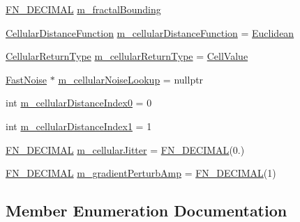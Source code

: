 \begin{DoxyCompactItemize}
\item 
\mbox{\hyperlink{_fast_noise_8h_a75a9ef6d2541c4921815b885bfd449c3}{F\+N\+\_\+\+D\+E\+C\+I\+M\+AL}} \mbox{\hyperlink{class_fast_noise_a64c5725bb6bf6f7a754176c3482ec782}{m\+\_\+fractal\+Bounding}}
\item 
\mbox{\hyperlink{class_fast_noise_a457e58d0da6dbe486deb5a21a3db52bf}{Cellular\+Distance\+Function}} \mbox{\hyperlink{class_fast_noise_a2013ce945eec3663ae04a5b36d3fdff8}{m\+\_\+cellular\+Distance\+Function}} = \mbox{\hyperlink{class_fast_noise_a457e58d0da6dbe486deb5a21a3db52bfa71b164a880847b07288ce70507bf1453}{Euclidean}}
\item 
\mbox{\hyperlink{class_fast_noise_a942d73b97b870138c9a07249d5a57737}{Cellular\+Return\+Type}} \mbox{\hyperlink{class_fast_noise_a9946be56a23e07f59b61fb7723ec638c}{m\+\_\+cellular\+Return\+Type}} = \mbox{\hyperlink{class_fast_noise_a942d73b97b870138c9a07249d5a57737a72381c72f202dd945fadc7e77da08dab}{Cell\+Value}}
\item 
\mbox{\hyperlink{class_fast_noise}{Fast\+Noise}} $\ast$ \mbox{\hyperlink{class_fast_noise_a8969fc9a8e20d0b6821419cb84499634}{m\+\_\+cellular\+Noise\+Lookup}} = nullptr
\item 
int \mbox{\hyperlink{class_fast_noise_ae6ed86f255c0f4a65482a1c178d748a7}{m\+\_\+cellular\+Distance\+Index0}} = 0
\item 
int \mbox{\hyperlink{class_fast_noise_ae7cad66902591680f7015eced127d45d}{m\+\_\+cellular\+Distance\+Index1}} = 1
\item 
\mbox{\hyperlink{_fast_noise_8h_a75a9ef6d2541c4921815b885bfd449c3}{F\+N\+\_\+\+D\+E\+C\+I\+M\+AL}} \mbox{\hyperlink{class_fast_noise_a672ff8895aefc8fed85b4ba77946f7e4}{m\+\_\+cellular\+Jitter}} = \mbox{\hyperlink{_fast_noise_8h_a75a9ef6d2541c4921815b885bfd449c3}{F\+N\+\_\+\+D\+E\+C\+I\+M\+AL}}(0.)
\item 
\mbox{\hyperlink{_fast_noise_8h_a75a9ef6d2541c4921815b885bfd449c3}{F\+N\+\_\+\+D\+E\+C\+I\+M\+AL}} \mbox{\hyperlink{class_fast_noise_adfc33805dc8b3bbb1639b742e32f693d}{m\+\_\+gradient\+Perturb\+Amp}} = \mbox{\hyperlink{_fast_noise_8h_a75a9ef6d2541c4921815b885bfd449c3}{F\+N\+\_\+\+D\+E\+C\+I\+M\+AL}}(1)
\end{DoxyCompactItemize}


\subsection{Member Enumeration Documentation}
\mbox{\label{class_fast_noise_a457e58d0da6dbe486deb5a21a3db52bf}} 
